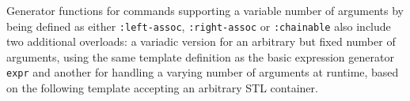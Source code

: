 
\noindent
Generator functions for \SMTLIB commands supporting a variable number of arguments by being defined as either \lstinline[language=SMTLib]{:left-assoc}, \lstinline[language=SMTLib]{:right-assoc} or \lstinline[language=SMTLib]{:chainable} %
also include two additional overloads:
a variadic version for an arbitrary but fixed number of arguments, using the same template definition as the basic expression generator \lstinline[style=c++]{expr}
and another for handling a varying number of arguments at runtime, based on the following template accepting an arbitrary STL container.

